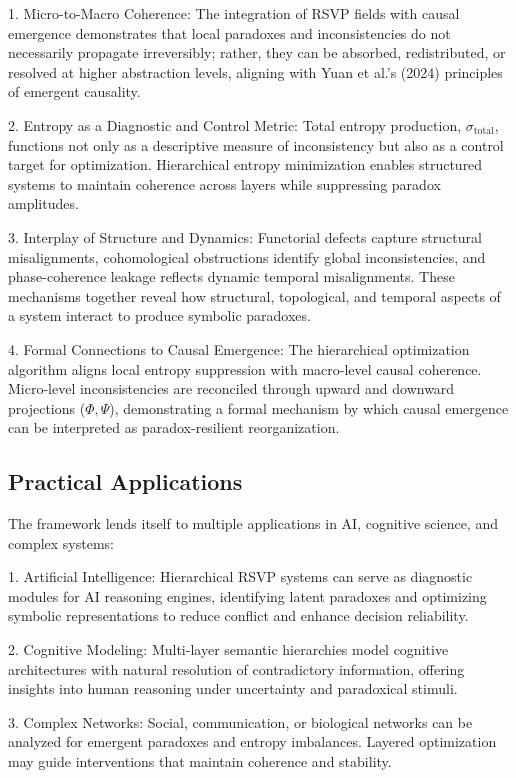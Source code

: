 \documentclass[12pt]{article}
\theoremstyle{plain}
\begin{document}
1. Micro-to-Macro Coherence: The integration of RSVP fields with causal emergence demonstrates that local paradoxes and inconsistencies do not necessarily propagate irreversibly; rather, they can be absorbed, redistributed, or resolved at higher abstraction levels, aligning with Yuan et al.’s (2024) principles of emergent causality.

2. Entropy as a Diagnostic and Control Metric: Total entropy production, \(\sigma_{\mathrm{total}}\), functions not only as a descriptive measure of inconsistency but also as a control target for optimization. Hierarchical entropy minimization enables structured systems to maintain coherence across layers while suppressing paradox amplitudes.

3. Interplay of Structure and Dynamics: Functorial defects capture structural misalignments, cohomological obstructions identify global inconsistencies, and phase-coherence leakage reflects dynamic temporal misalignments. These mechanisms together reveal how structural, topological, and temporal aspects of a system interact to produce symbolic paradoxes.

4. Formal Connections to Causal Emergence: The hierarchical optimization algorithm aligns local entropy suppression with macro-level causal coherence. Micro-level inconsistencies are reconciled through upward and downward projections (\(\Phi, \Psi\)), demonstrating a formal mechanism by which causal emergence can be interpreted as paradox-resilient reorganization.

\subsection{Practical Applications}

The framework lends itself to multiple applications in AI, cognitive science, and complex systems:

1. Artificial Intelligence: Hierarchical RSVP systems can serve as diagnostic modules for AI reasoning engines, identifying latent paradoxes and optimizing symbolic representations to reduce conflict and enhance decision reliability.

2. Cognitive Modeling: Multi-layer semantic hierarchies model cognitive architectures with natural resolution of contradictory information, offering insights into human reasoning under uncertainty and paradoxical stimuli.

3. Complex Networks: Social, communication, or biological networks can be analyzed for emergent paradoxes and entropy imbalances. Layered optimization may guide interventions that maintain coherence and stability.
\end{document}
